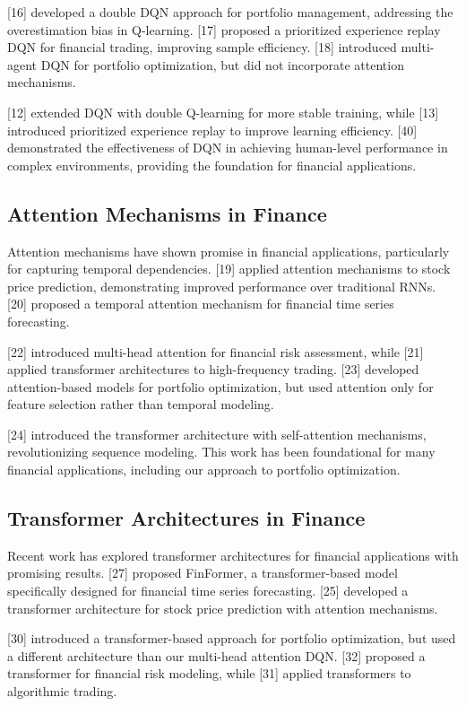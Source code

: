 \documentclass[11pt]{article}
\begin{document}
[16] developed a double DQN approach for portfolio management, addressing the overestimation bias in Q-learning. [17] proposed a prioritized experience replay DQN for financial trading, improving sample efficiency. [18] introduced multi-agent DQN for portfolio optimization, but did not incorporate attention mechanisms.

[12] extended DQN with double Q-learning for more stable training, while [13] introduced prioritized experience replay to improve learning efficiency. [40] demonstrated the effectiveness of DQN in achieving human-level performance in complex environments, providing the foundation for financial applications.

\subsection{Attention Mechanisms in Finance}

Attention mechanisms have shown promise in financial applications, particularly for capturing temporal dependencies. [19] applied attention mechanisms to stock price prediction, demonstrating improved performance over traditional RNNs. [20] proposed a temporal attention mechanism for financial time series forecasting.

[22] introduced multi-head attention for financial risk assessment, while [21] applied transformer architectures to high-frequency trading. [23] developed attention-based models for portfolio optimization, but used attention only for feature selection rather than temporal modeling.

[24] introduced the transformer architecture with self-attention mechanisms, revolutionizing sequence modeling. This work has been foundational for many financial applications, including our approach to portfolio optimization.

\subsection{Transformer Architectures in Finance}

Recent work has explored transformer architectures for financial applications with promising results. [27] proposed FinFormer, a transformer-based model specifically designed for financial time series forecasting. [25] developed a transformer architecture for stock price prediction with attention mechanisms.

[30] introduced a transformer-based approach for portfolio optimization, but used a different architecture than our multi-head attention DQN. [32] proposed a transformer for financial risk modeling, while [31] applied transformers to algorithmic trading.
\end{document}
